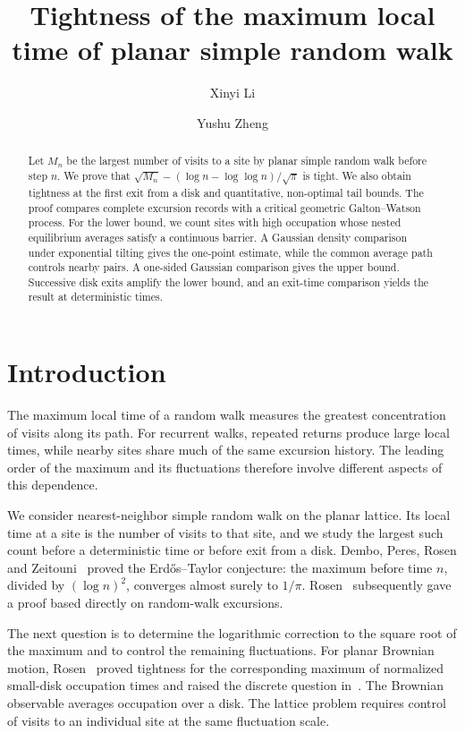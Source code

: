 \documentclass[11pt,letterpaper,reqno]{amsart}
\title[Maximum local time of planar simple random walk]{Tightness of the maximum local time of planar simple random walk}
\author[X. Li]{Xinyi Li\authormark{1}}
\author[Y. Zheng]{Yushu Zheng\authormark{2}}
\date{}
\numberwithin{equation}{section}
\theoremstyle{remark}
\begin{document}
\begin{abstract}
Let $M_n$ be the largest number of visits to a site by planar simple random walk before step $n$. We prove that $\sqrt{M_n}-(\log n-\log\log n)/\sqrt\pi$ is tight. We also obtain tightness at the first exit from a disk and quantitative, non-optimal tail bounds. The proof compares complete excursion records with a critical geometric Galton--Watson process. For the lower bound, we count sites with high occupation whose nested equilibrium averages satisfy a continuous barrier. A Gaussian density comparison under exponential tilting gives the one-point estimate, while the common average path controls nearby pairs. A one-sided Gaussian comparison gives the upper bound. Successive disk exits amplify the lower bound, and an exit-time comparison yields the result at deterministic times.
\end{abstract}
\maketitle

\section{Introduction}\label{sec:intro}
The maximum local time of a random walk measures the greatest concentration of visits along its path. For recurrent walks, repeated returns produce large local times, while nearby sites share much of the same excursion history. The leading order of the maximum and its fluctuations therefore involve different aspects of this dependence.

We consider nearest-neighbor simple random walk on the planar lattice. Its local time at a site is the number of visits to that site, and we study the largest such count before a deterministic time or before exit from a disk. Dembo, Peres, Rosen and Zeitouni~\cite{DPRZ} proved the Erd\H{o}s--Taylor conjecture: the maximum before time $n$, divided by $(\log n)^2$, converges almost surely to $1/\pi$. Rosen~\cite[Theorem 1.1]{ET} subsequently gave a proof based directly on random-walk excursions.

The next question is to determine the logarithmic correction to the square root of the maximum and to control the remaining fluctuations. For planar Brownian motion, Rosen~\cite[Theorem 1.1]{GW} proved tightness for the corresponding maximum of normalized small-disk occupation times and raised the discrete question in~\cite[Section 1.2]{GW}. The Brownian observable averages occupation over a disk. The lattice problem requires control of visits to an individual site at the same fluctuation scale.
\end{document}
